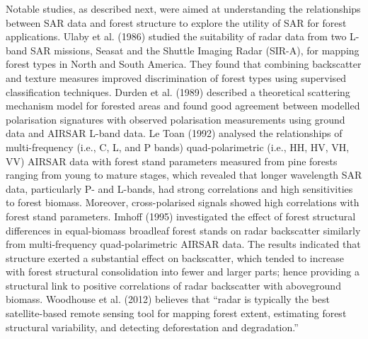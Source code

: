 Notable studies, as described next, were aimed at understanding the relationships between SAR data and forest structure to explore the utility of SAR for forest applications. Ulaby et al. (1986) studied the suitability of radar data from two L-band SAR missions, Seasat and the Shuttle Imaging Radar (SIR-A), for mapping forest types in North and South America. They found that combining backscatter and texture measures improved discrimination of forest types using supervised classification techniques. Durden et al. (1989) described a theoretical scattering mechanism model for forested areas and found good agreement between modelled polarisation signatures with observed polarisation measurements using ground data and AIRSAR L-band data. Le Toan (1992) analysed the relationships of multi-frequency (i.e., C, L, and P bands) quad-polarimetric (i.e., HH, HV, VH, VV) AIRSAR data with forest stand parameters measured from pine forests ranging from young to mature stages, which revealed that longer wavelength SAR data, particularly P- and L-bands, had strong correlations and high sensitivities to forest biomass. Moreover, cross-polarised signals showed high correlations with forest stand parameters. Imhoff (1995) investigated the effect of forest structural differences in equal-biomass broadleaf forest stands on radar backscatter similarly from multi-frequency quad-polarimetric AIRSAR data. The results indicated that structure exerted a substantial effect on backscatter, which tended to increase with forest structural consolidation into fewer and larger parts; hence providing a structural link to positive correlations of radar backscatter with aboveground biomass. Woodhouse et al. (2012) believes that \enquote{radar is typically the best satellite-based remote sensing tool for mapping forest extent, estimating forest structural variability, and detecting deforestation and degradation.}


